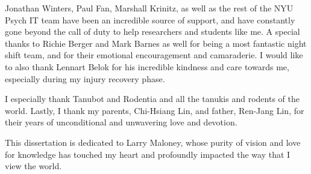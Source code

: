 \documentclass[11pt,letterpaper]{report}
\begin{document}
Jonathan Winters, Paul Fan, Marshall Krinitz, as well as the rest of the NYU Psych IT team have been an incredible source of support, and have constantly gone beyond the call of duty to help researchers and students like me. A special thanks to Richie Berger and Mark Barnes as well for being a most fantastic night shift team, and for their emotional encouragement and camaraderie. I would like to also thank Lennart Belok for his incredible kindness and care towards me, especially during my injury recovery phase.

I especially thank Tanubot and Rodentia and all the tanukis and rodents of the world. Lastly, I thank my parents, Chi-Hsiang Lin, and father, Ren-Jang Lin, for their years of unconditional and unwavering love and devotion.

This dissertation is dedicated to Larry Maloney, whose purity of vision and love for knowledge has touched my heart and profoundly impacted the way that I view the world.

\clearpage


\begin{singlespace}

\clearpage
\tableofcontents
\pagestyle{plain}
\clearpage
\end{singlespace}


\begin{singlespace}
\pagestyle{plain}

\newpage
{}
{}
\listoffigures
\newpage

\newpage
{}
{}
\listoftables
\newpage

\newpage
{}
{}
\newpage

\end{singlespace}

\end{document}
